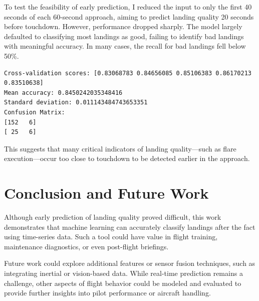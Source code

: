 \documentclass[conference]{IEEEtran}
\begin{document}
To test the feasibility of early prediction, I reduced the input to only the first 40 seconds of each 60-second approach, aiming to predict landing quality 20 seconds before touchdown. However, performance dropped sharply. The model largely defaulted to classifying most landings as good, failing to identify bad landings with meaningful accuracy. In many cases, the recall for bad landings fell below 50\%.

\begin{lstlisting}[caption={Gradient boosting prediciton model performance}]
Cross-validation scores: [0.83068783 0.84656085 0.85106383 0.86170213 0.83510638]
Mean accuracy: 0.8450242035348416
Standard deviation: 0.011143484743653351
Confusion Matrix:
[152   6]
[ 25   6]
\end{lstlisting}


This suggests that many critical indicators of landing quality—such as flare execution—occur too close to touchdown to be detected earlier in the approach.

\balance

\section{Conclusion and Future Work}
Although early prediction of landing quality proved difficult, this work demonstrates that machine learning can accurately classify landings after the fact using time-series data. Such a tool could have value in flight training, maintenance diagnostics, or even post-flight briefings.

Future work could explore additional features or sensor fusion techniques, such as integrating inertial or vision-based data. While real-time prediction remains a challenge, other aspects of flight behavior could be modeled and evaluated to provide further insights into pilot performance or aircraft handling.



\end{document}
